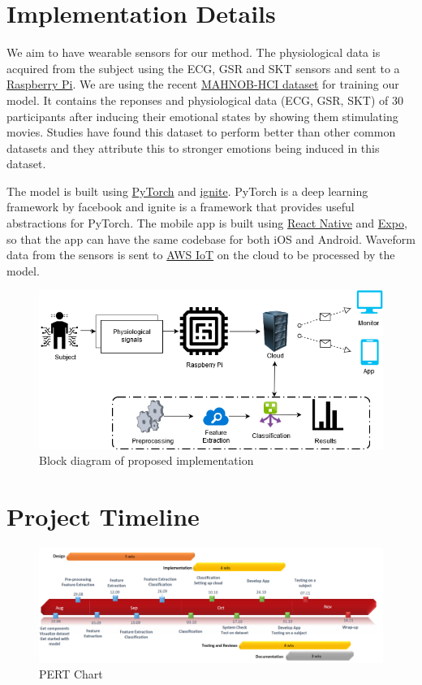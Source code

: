 \documentclass[11pt]{article}
\theoremstyle{definition}
\begin{document}
  \section{Implementation Details}
    We aim to have wearable sensors for our method. The physiological data is acquired from the subject using the ECG, GSR and SKT sensors and sent to a  \href{https://www.raspberrypi.org/}{Raspberry Pi}. We are using the recent \href{https://mahnob-db.eu/hci-tagging/}{ MAHNOB-HCI dataset}\cite{soleymani_multimodal_2012} for training our model. It contains the reponses and physiological data (ECG, GSR, SKT) of 30 participants after inducing their emotional states by showing them stimulating movies.
    Studies have found this dataset to perform better than other common datasets and they attribute this to stronger emotions being induced in this dataset\cite{simon_selection_2016}.

    The model is built using \href{https://github.com/pytorch/pytorch}{PyTorch} and \href{https://github.com/pytorch/ignite}{ignite}. PyTorch is a deep learning framework by facebook and ignite is a framework that provides useful abstractions for PyTorch. The mobile app is built using \href{https://facebook.github.io/react-native/}{React Native} and \href{https://expo.io/}{Expo}, so that the app can have the same codebase for both iOS and Android. Waveform data from the sensors is sent to \href{https://aws.amazon.com/iot/}{AWS IoT} on the cloud to be processed by the model.

    \begin{figure}[h]
      \centering
      \includegraphics[scale=0.6]{schematic}
      \caption{Block diagram of proposed implementation}
    \end{figure}

  \newpage
  \section{Project Timeline}
    \begin{figure}[h]
      \centering
      \includegraphics[width=\textwidth, scale=1.5]{pert_chart}
      \caption{PERT Chart}
    \end{figure}

  
  
\end{document}
